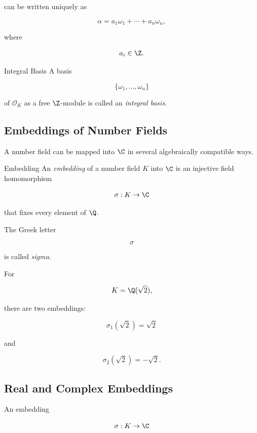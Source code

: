 can be written uniquely as

\[ \alpha=a_1\omega_1+\cdots+a_n\omega_n, \]

where

\[ a_i\in\Z. \]

\begin{definitionbox}{Integral Basis}
A basis

\[ \{\omega_1,\ldots,\omega_n\} \]

of \(\mathcal O_K\) as a free \(\Z\)-module is called an
\emph{integral basis}.
\end{definitionbox}

\subsection{Embeddings of Number Fields}
\label{subsec:number-field-embeddings}

A number field can be mapped into \(\C\) in several algebraically compatible
ways.

\begin{definitionbox}{Embedding}
An \emph{embedding} of a number field \(K\) into \(\C\) is an injective field
homomorphism

\[ \sigma:K\to\C \]

that fixes every element of \(\Q\).
\end{definitionbox}

The Greek letter

\[ \sigma \]

is called \emph{sigma}.

For

\[ K=\Q(\sqrt2), \]

there are two embeddings:

\[ \sigma_1(\sqrt2)=\sqrt2 \]

and

\[ \sigma_2(\sqrt2)=-\sqrt2. \]

\subsection{Real and Complex Embeddings}
\label{subsec:real-complex-embeddings}

An embedding

\[ \sigma:K\to\C \]

